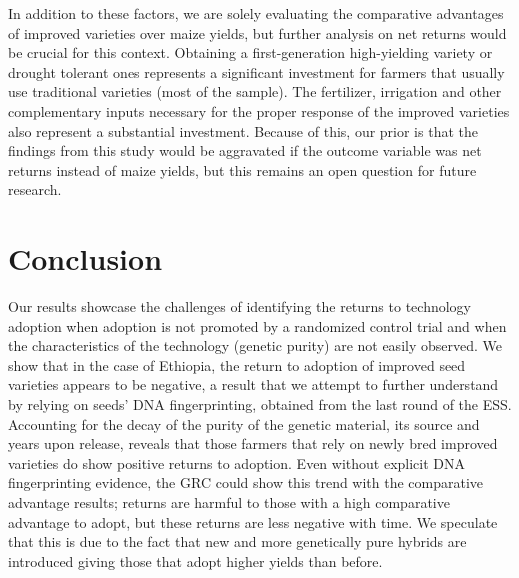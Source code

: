 \documentclass[11pt]{article}
\begin{document}
In addition to these factors, we are solely evaluating the comparative advantages of improved varieties over maize yields, but further analysis on net returns would be crucial for this context. Obtaining a first-generation high-yielding variety or drought tolerant ones represents a significant investment for farmers that usually use traditional varieties (most of the sample). The fertilizer, irrigation and other complementary inputs necessary for the proper response of the improved varieties also represent a substantial investment. Because of this, our prior is that the findings from this study would be aggravated if the outcome variable was net returns instead of maize yields, but this remains an open question for future research.

\section{Conclusion}\label{sec:conclusion}


Our results showcase the challenges of identifying the returns to technology adoption when adoption is not promoted by a randomized control trial and when the characteristics of the technology (genetic purity) are not easily observed. We show that in the case of Ethiopia, the return to adoption of improved seed varieties appears to be negative, a result that we attempt to further understand by relying on seeds' DNA fingerprinting, obtained from the last round of the ESS. Accounting for the decay of the purity of the genetic material, its source and years upon release, reveals that those farmers that rely on newly bred improved varieties do show positive returns to adoption. Even without explicit DNA fingerprinting evidence, the GRC could show this trend with the comparative advantage results; returns are harmful to those with a high comparative advantage to adopt, but these returns are less negative with time. We speculate that this is due to the fact that new and more genetically pure hybrids are introduced giving those that adopt higher yields than before.
\end{document}
